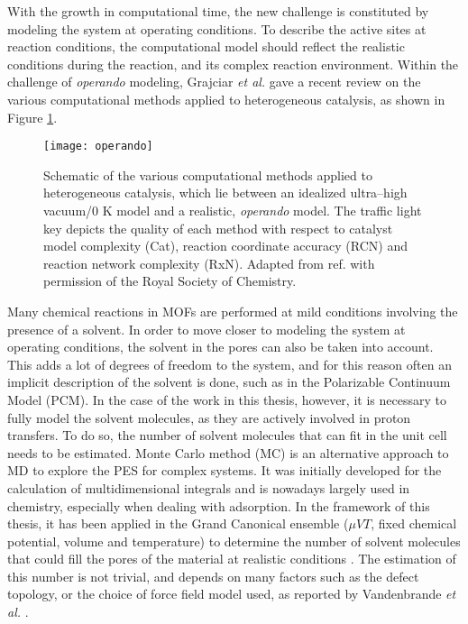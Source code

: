 With the growth in computational time, the new challenge is constituted by modeling the system at operating conditions. 
To describe the active sites at reaction conditions, the computational model should reflect the realistic conditions during the reaction, and its complex reaction environment. Within the challenge of \textit{operando} modeling, Grajciar \textit{et al.} \cite{grajciar2018towards} gave a recent review on the various computational methods applied to heterogeneous catalysis, as shown in Figure \ref{fig:operando}. 
\npar
\begin{figure}[!htbp]
	\centering
 	\texttt{[image: operando]}
	\caption{Schematic of the various computational methods applied to heterogeneous catalysis, which lie between an idealized ultra--high vacuum/0 K model and a realistic, \textit{operando} model. The traffic light key depicts the quality of each method with respect to catalyst model complexity (Cat), reaction coordinate accuracy (RCN) and reaction network complexity (RxN). Adapted from ref. \cite{grajciar2018towards} with permission of the Royal Society of Chemistry.}
 \label{fig:operando}
\end{figure}
Many chemical reactions in MOFs are performed at mild conditions involving the presence of a solvent. In order to move closer to modeling the system at operating conditions, the solvent in the pores can also be taken into account. This adds a lot of degrees of freedom to the system, and for this reason often an implicit description of the solvent is done, such as in the Polarizable Continuum Model (PCM)\cite{cances1997new}. In the case of the work in this thesis, however, it is necessary to fully model the solvent molecules, as they are actively involved in proton transfers. To do so, the number of solvent molecules that can fit in the unit cell needs to be estimated. Monte Carlo method (MC) is an alternative approach to MD to explore the PES for complex systems. It was initially developed for the calculation of multidimensional integrals and is nowadays largely used in chemistry, especially when dealing with adsorption. In the framework of this thesis, it has been applied in the Grand Canonical ensemble ($\mu VT$, fixed chemical potential, volume and temperature) to determine the number of solvent molecules that could fill the pores of the material at realistic conditions \cite{dubbeldam2013inner}. The estimation of this number is not trivial, and depends on many factors such as the defect topology, or the choice of force field model used, as reported by Vandenbrande \textit{et al.} \cite{vandenbrande2017methane}.
\npar


